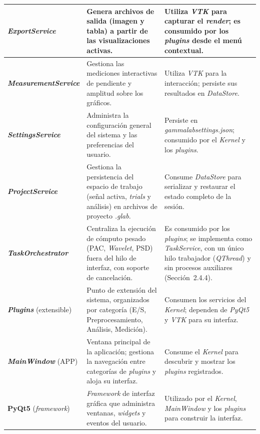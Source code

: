 \documentclass[12pt,letterpaper,oneside]{article}
\DeclareRobustCommand{\_}{\textunderscore\allowbreak}
\begin{document}
\begin{center}
\begin{longtable}{|p{}|p{}|p{}|}
\textbf{\textit{ExportService}} & Genera archivos de salida (imagen y tabla) a partir de las visualizaciones activas. & Utiliza \textit{VTK} para capturar el \textit{render}; es consumido por los \textit{plugins} desde el men\'u contextual. \\
\hline

\textbf{\textit{Measurement\-Service}} & Gestiona las mediciones interactivas de pendiente y amplitud sobre los gr\'aficos. & Utiliza \textit{VTK} para la interacci\'on; persiste sus resultados en \textit{DataStore}. \\
\hline

\textbf{\textit{SettingsService}} & Administra la configuraci\'on general del sistema y las preferencias del usuario. & Persiste en \textit{gamma\_\allowbreak lab\_\allowbreak settings.json}; consumido por el \textit{Kernel} y los \textit{plugins}. \\
\hline

\textbf{\textit{ProjectService}} & Gestiona la persistencia del espacio de trabajo (se\~nal activa, \textit{trials} y an\'alisis) en archivos de proyecto \textit{.glab}. & Consume \textit{DataStore} para serializar y restaurar el estado completo de la sesi\'on. \\
\hline

\textbf{\textit{Task\-Orchestrator}} & Centraliza la ejecuci\'on de c\'omputo pesado (PAC, \textit{Wavelet}, PSD) fuera del hilo de interfaz, con soporte de cancelaci\'on. & Es consumido por los \textit{plugins}; se implementa como \textit{TaskService}, con un único hilo trabajador (\textit{QThread}) y sin procesos auxiliares (Sección~2.4.4). \\
\hline

\textbf{\textit{Plugins}} (extensible) & Punto de extensi\'on del sistema, organizados por categor\'ia (E/S, Preprocesamiento, An\'alisis, Medici\'on). & Consumen los servicios del \textit{Kernel}; dependen de \textit{PyQt5} y \textit{VTK} para su interfaz. \\
\hline

\textbf{\textit{MainWindow}} (APP) & Ventana principal de la aplicaci\'on; gestiona la navegaci\'on entre categor\'ias de \textit{plugins} y aloja su interfaz. & Consume el \textit{Kernel} para descubrir y mostrar los \textit{plugins} registrados. \\
\hline

\textbf{PyQt5} (\textit{framework}) & \textit{Framework} de interfaz gr\'afica que administra ventanas, \textit{widgets} y eventos del usuario. & Utilizado por el \textit{Kernel}, \textit{MainWindow} y los \textit{plugins} para construir la interfaz. \\
\hline


\end{longtable}
\end{center}
\end{document}
